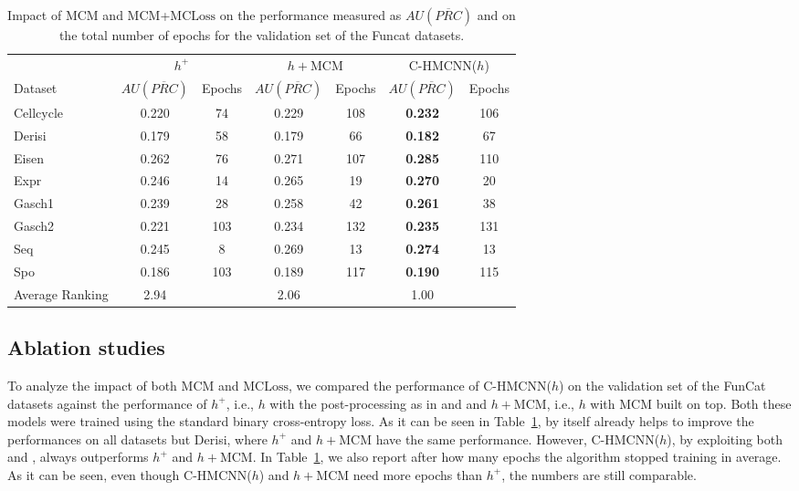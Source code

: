 \documentclass{article}
\newcommand{\module}{\text{MCM}}
\newcommand{\loss}{\text{MCLoss}}
\newcommand{\system}[1]{C-HMCNN(#1)}
\newcommand{\auprc}{$AU(\overline{PRC}) $}
\begin{document}
\begin{table}[t]
    \centering
        \caption{Impact of $\module$ and $\module$+$\loss$ on the performance measured as {\auprc} and on the total number of epochs for the validation set of the Funcat datasets.}
    \begin{tabular}{l c c c c c c}
    \toprule
           & \multicolumn{2}{c}{$h^+$} & \multicolumn{2}{c}{$h\!+\!\module$} & \multicolumn{2}{c}{\system{$h$}} \\
         Dataset & \auprc & Epochs & \auprc & Epochs & \auprc & Epochs \\
         \midrule
         {\sc Cellcycle} & 0.220 & 74 & 0.229 & 108 & {\textbf{0.232}} & 106 \\
         {\sc Derisi} & 0.179 & 58 & 0.179 & 66  &  {\textbf{0.182}} & 67\\
         {\sc Eisen} & 0.262 & 76 & 0.271 & 107 & {\textbf{0.285}} & 110 \\
{\sc Expr} & 0.246 & 14 &  0.265 & 19 & {\textbf{0.270}} & 20 \\
         {\sc Gasch1} & 0.239 & 28 & 0.258 & 42 & {\textbf{0.261}} & 38\\
         {\sc Gasch2} & 0.221 & 103 & 0.234 & 132 & {\textbf{0.235}} & 131 \\
         {\sc Seq} & 0.245 & 8 & 0.269 & 13 & {\textbf{0.274}} & 13 \\
         {\sc Spo} & 0.186 & 103 & 0.189 & 117 & {\textbf{0.190}} & 115 \\
         \midrule
         {\sc Average Ranking} & 2.94 & & 2.06 & & 1.00 & \\
    \bottomrule
    \end{tabular}
    \label{tab:ablation}
\end{table}



\subsection{Ablation studies}


To analyze the impact of both $\module$ and $\loss$, we compared the performance of \system{$h$} on the validation set of the FunCat datasets against the performance of  $h^+$, i.e., $h$ with the post-processing as in \cite{cerri2016} and \cite{feng2018} and $h\!+\!\module$, i.e., $h$ with $\module$ built on top. Both these models were trained using the standard binary cross-entropy loss. 
As it can be seen in Table~\ref{tab:ablation}, \module{} by itself already helps to improve the performances on all datasets but Derisi, where $h^+$ and $h\!+\!\module$ have the same performance. However, \system{$h$}, by exploiting both \module{} and \loss, always outperforms $h^+$ and $h\!+\!\module$. In Table~\ref{tab:ablation}, we also report after how many epochs the algorithm stopped training in average. As it can be seen, even though \system{$h$} and $h\!+\!\module$ need more epochs than $h^+$, the numbers are still comparable. 
\end{document}
